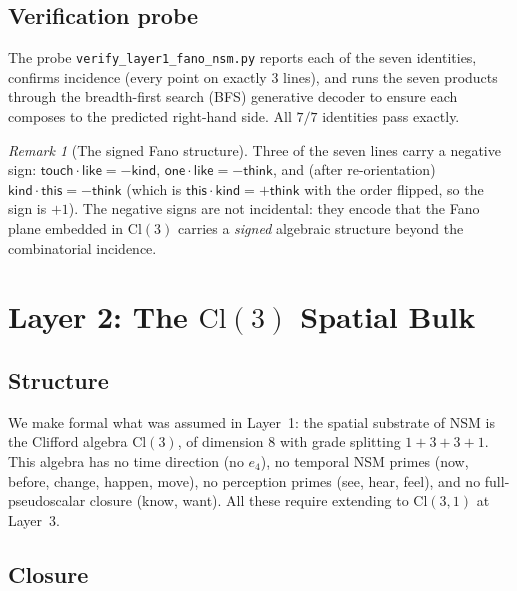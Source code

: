 \documentclass[11pt,a4paper]{article}
\theoremstyle{plain}
\theoremstyle{definition}
\theoremstyle{remark}
\newtheorem{remark}[theorem]{Remark}
\numberwithin{equation}{section}
\providecommand{\Cl}{\mathrm{Cl}}
\begin{document}
\subsection{Verification probe}

The probe \texttt{verify\_layer1\_fano\_nsm.py} reports each of the
seven identities, confirms incidence (every point on exactly $3$
lines), and runs the seven products through the breadth-first
search (BFS) generative decoder to ensure each composes to the
predicted right-hand side.  All $7/7$ identities pass exactly.

\begin{remark}[The signed Fano structure]
Three of the seven lines carry a negative sign: $\mathsf{touch}
\cdot \mathsf{like} = -\mathsf{kind}$, $\mathsf{one} \cdot
\mathsf{like} = -\mathsf{think}$, and (after re-orientation)
$\mathsf{kind} \cdot \mathsf{this} = -\mathsf{think}$ (which is
$\mathsf{this} \cdot \mathsf{kind} = +\mathsf{think}$ with the
order flipped, so the sign is $+1$).  The negative signs are not
incidental: they encode that the Fano plane embedded in $\Cl(3)$
carries a \emph{signed} algebraic structure beyond the
combinatorial incidence.
\end{remark}


\section{Layer 2: The $\Cl(3)$ Spatial Bulk}\label{sec:layer2}

\subsection{Structure}

We make formal what was assumed in Layer~1: the spatial substrate
of NSM is the Clifford algebra $\Cl(3)$, of dimension $8$ with
grade splitting $1 + 3 + 3 + 1$.  This algebra has no time
direction (no $e_4$), no temporal NSM primes (\textsf{now},
\textsf{before}, \textsf{change}, \textsf{happen}, \textsf{move}),
no perception primes (\textsf{see}, \textsf{hear}, \textsf{feel}),
and no full-pseudoscalar closure (\textsf{know}, \textsf{want}).
All these require extending to $\Cl(3,1)$ at Layer~3.

\subsection{Closure}
\end{document}
